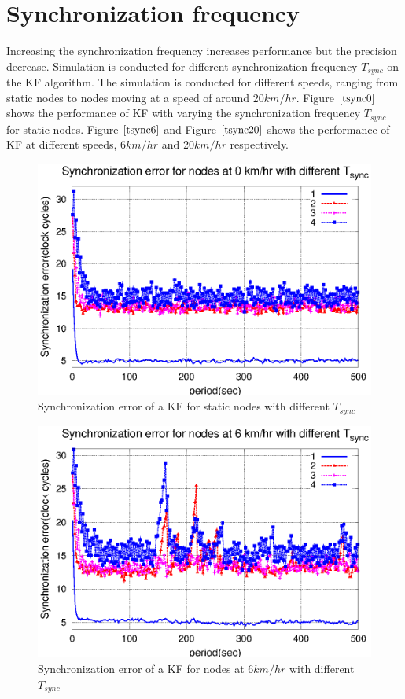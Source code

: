\documentclass[a4paper,10pt]{report}
\begin{document}
\section{\textbf{Synchronization frequency}}
Increasing the synchronization frequency increases performance but the precision decrease. Simulation is conducted for different synchronization frequency $T_{sync}$ on the KF algorithm. The simulation is conducted for different speeds, ranging from static nodes to nodes moving at a speed of around 20$km/hr$. 
\newline
Figure $\ref{tsync0}$ shows the performance of KF with varying the synchronization frequency $T_{sync}$ for static nodes. Figure $\ref{tsync6}$ and Figure $\ref{tsync20}$ shows the performance of KF at different speeds, 6$km/hr$ and 20$km/hr$ respectively.
\begin{figure}[!h]
\centering
\includegraphics[width= 0.7 \textwidth]{tsync0}
\caption{Synchronization error of a KF for static nodes with different $T_{sync}$} \label{tsync0}
\end{figure}
\begin{figure}[!h]
\centering
\includegraphics[width= 0.7 \textwidth]{tsync6}
\caption{Synchronization error of a KF for nodes at 6$km/hr$ with different $T_{sync}$} \label{tsync6}
\end{figure}
\end{document}
